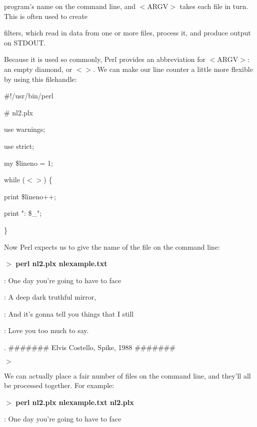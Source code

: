 \documentclass[a4paper,11pt]{book}
\begin{document}
\noindent program's name on the command line, and $<$ARGV$>$ takes each file in turn. This is often used to create

\noindent filters, which read in data from one or more files, process it, and produce output on STDOUT.

\noindent 

\noindent Because it is used so commonly, Perl provides an abbreviation for $<$ARGV$>$: an empty diamond, or $<$$>$. We can make our line counter a little more flexible by using this filehandle:

\noindent 

\noindent \#!/usr/bin/perl

\noindent \# nl2.plx

\noindent use warnings;

\noindent use strict;

\noindent 

\noindent my \$lineno = 1;

\noindent 

\noindent while ($<$$>$) \{

\noindent print \$lineno++;

\noindent print ": \$\_";

\noindent \}

\noindent 

\noindent Now Perl expects us to give the name of the file on the command line:

\noindent 

\noindent $>$ \textbf{perl nl2.plx nlexample.txt}

: One day you're going to have to face

: A deep dark truthful mirror,

: And it's gonna tell you things that I still

: Love you too much to say.

. \#\#\#\#\#\#\# Elvis Costello, Spike, 1988 \#\#\#\#\#\#\#

\noindent $>$

\noindent 

\noindent We can actually place a fair number of files on the command line, and they'll all be processed together. For example:

\noindent 

\noindent $>$ \textbf{perl nl2.plx nlexample.txt nl2.plx}

: One day you're going to have to face
\end{document}
